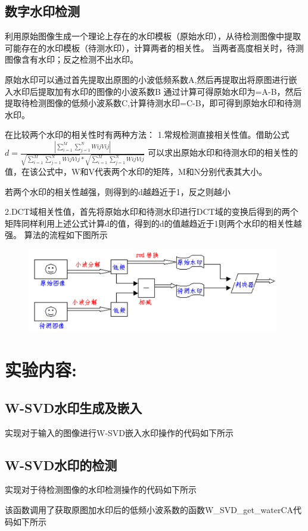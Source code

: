 \documentclass[a4paper,11pt,UTF8]{ctexart}
\newcommand{\bottomcaption}{%
\setlength{\abovecaptionskip}{6pt}%
\setlength{\belowcaptionskip}{6pt}%
\caption}
\newcommand{\xiaowuhao}{\fontsize{9pt}{\baselineskip}\selectfont}   %
\begin{document}
  \subsection{数字水印检测}
    利用原始图像生成一个理论上存在的水印模板（原始水印），从待检测图像中提取可能存在的水印模板（待测水印），计算两者的相关性。
    当两者高度相关时，待测图像含有水印；反之检测不出水印。\par
    原始水印可以通过首先提取出原图的小波低频系数A,然后再提取出将原图进行嵌入水印后提取加有水印的图像的小波系数B
    通过计算可得原始水印为=A-B，然后提取待检测图像的低频小波系数C,计算待测水印=C-B，即可得到原始水印和待测水印。\par
    在比较两个水印的相关性时有两种方法：
    1.常规检测直接相关性值。借助公式$d=\frac{\left | \sum_{i=1}^{M} \sum_{j=1}^{N}W{ij}V{ij}    \right | }{\sqrt{ \sum_{i=1}^{M} \sum_{j=1}^{N}W{ij}V{ij}}*\sqrt{ \sum_{i=1}^{M} \sum_{j=1}^{N}W{ij}V{ij}}  } $
    可以求出原始水印和待测水印的相关性的值，在该公式中，W和V代表两个水印的矩阵，M和N分别代表其大小。\par
    若两个水印的相关性越强，则得到的d越趋近于1，反之则越小\par
    2.DCT域相关性值，首先将原始水印和待测水印进行DCT域的变换后得到的两个矩阵同样利用上述公式计算d的值，得到的d的值越趋近于1则两个水印的相关性越强。
    算法的流程如下图所示
    \begin{figure}[H]
      \centering
      \includegraphics[width=11cm]{W_SVD_find_yuanli.png}
      \bottomcaption{\xiaowuhao{W-SVD水印检测原理}}
    \end{figure}

\section{实验内容:}
\subsection{W-SVD水印生成及嵌入}
    实现对于输入的图像进行W-SVD嵌入水印操作的代码如下所示
    
\newpage
\subsection{W-SVD水印的检测}
    实现对于待检测图像的水印检测操作的代码如下所示
    
    该函数调用了获取原图加水印后的低频小波系数的函数W\_SVD\_get\_waterCA代码如下所示
    
\newpage
\end{document}
